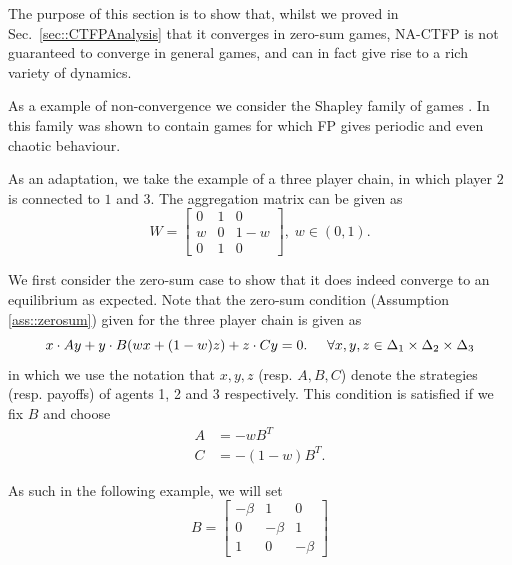 \documentclass{article}
\theoremstyle{definition}
\begin{document}
  The purpose of this section is to show that, whilst we proved in Sec.~\ref{sec::CTFPAnalysis}
  that it converges in zero-sum games, NA-CTFP is not guaranteed to
  converge in general games, and can in fact give rise to a rich 
  variety of dynamics.

  As a example of non-convergence we consider the Shapley family of games \cite{Shapley2016}. In \cite{VanStrien2011} this family was shown to contain games for which FP gives periodic and even chaotic behaviour.

  As an adaptation, we take the example of a three player chain, in which player $2$ is connected to $1$ and $3$. The aggregation matrix can be given as
%
  \begin{equation*}
    W = \begin{bmatrix}
      0 & 1 & 0 \\
      w & 0 & 1 - w \\
      0 & 1 & 0
    \end{bmatrix}, \; w \in (0, 1).
  \end{equation*}


  We first consider the zero-sum case to show that it does indeed converge to an equilibrium as expected. Note that the zero-sum condition (Assumption \ref{ass::zerosum}) given for the three player chain is given as
%
  \begin{equation}
    x \cdot A y + y \cdot B (w x + (1-w)z) + z \cdot C y = 0. \hspace{0.5cm} \forall x, y, z \in \Delta_1 \times \Delta_2 \times \Delta_3
  \end{equation}
  in which we use the notation that $x, y, z$ (resp. $A, B, C$) denote the strategies (resp. payoffs) of agents 1, 2 and 3 respectively. This condition is satisfied if we fix $B$ and choose
%
  \begin{align} \label{eq::zeroSumShapley}
    A & = - w B^T \nonumber \\
    C & = - (1 - w) B^T. 
  \end{align}

  As such in the following example, we will set
  \begin{equation}
    B =  \begin{bmatrix}
      - \beta & 1 & 0 \\
      0 & -\beta & 1 \\
      1 & 0 & -\beta
    \end{bmatrix}
  \end{equation}
  
\end{document}
